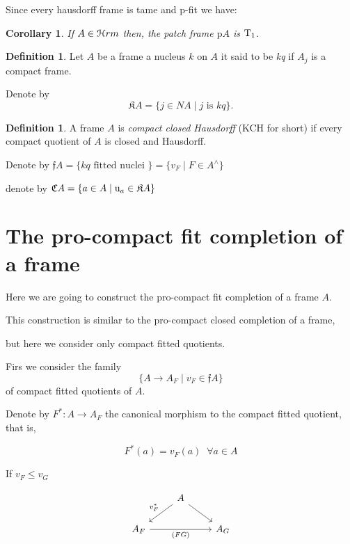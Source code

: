 \documentclass[11pt]{amsart}
\theoremstyle{plain}
\newtheorem{cor}[thm]{Corollary}
\theoremstyle{definition}
\newtheorem{dfn}[thm]{Definition}
\begin{document}
Since every hausdorff frame is tame and {\rm p-fit} we have:

	\begin{cor}\label{fitpro2}
		If $A\in\EuScript{H}rm$ then, the patch frame  $\mathrm{p}A$ is ${\rm T}_{1}$.
	\end{cor}	





\begin{dfn}\label{KQ}
Let $A$ be a frame a nucleus $k$ on $A$ it said to be \emph{kq} if $A_{j}$ is a compact frame. 
\end{dfn}
Denote by 
\[
\mathfrak{K}A=\{j\in NA\mid j \text{ is } kq\}.
\]

\begin{dfn}\label{KCH}
A frame $A$ is \emph{compact closed Hausdorff} ({\rm KCH} for short) if every compact quotient of $A$ is closed and Hausdorff.
\end{dfn}



Denote by $\mathfrak{f}A=\{kq\text{ fitted nuclei }\}=\{v_{F}\mid F\in A^{\wedge}\}$




denote by $\mathfrak{C}A=\{a\in A\mid {\rm u}_{a}\in\mathfrak{K}A\}$

\section{The pro-compact fit completion of a frame}



Here we are going to construct the pro-compact fit completion of a frame $A$. 

This construction is similar to the pro-compact closed completion of a frame, 

but here we consider only compact fitted quotients.



Firs we consider the family 
\[\{A\rightarrow A_{F}\mid v_{F}\in\mathfrak{f}A\}\] of compact fitted quotients of $A$.


Denote by $F^{*}\colon A\rightarrow A_{F}$ the canonical morphism to the compact fitted quotient, that is,

\[F^{*}(a)=v_{F}(a)\;\;\forall a\in A\]


If $v_{F}\leq v_{G}$


\[
\begin{tikzcd}
   & A \arrow[dl, "v_{F}^{*}"'] \arrow[dr] & \\
   A_{F} \arrow[rr, "(FG)"'] & &  A_{G}
\end{tikzcd}
\]
\end{document}
